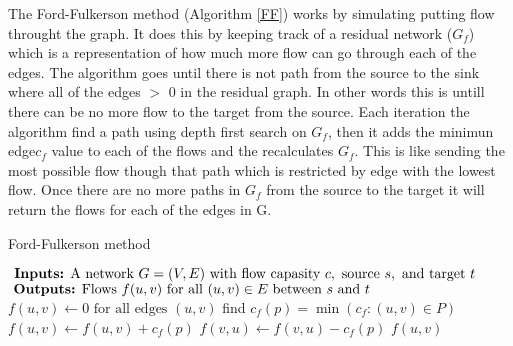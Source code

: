 \documentclass{sig-alternate-05-2015}
\begin{document}
The Ford-Fulkerson method (Algorithm \ref{FF}) works by simulating putting flow throught the graph.  It does this by keeping track of a residual network ($G_{f}$) which is a representation of how much more flow can go through each of the edges.  The algorithm goes until there is not path from the source to the sink where all of the edges $>$ 0 in the residual graph.  In other words this is untill there can be no more flow to the target from the source.  Each iteration the algorithm find a path using depth first search on $G_{f}$, then it adds the minimun edge$ c_{f}$ value to each of the flows and the recalculates $G_{f}$.  This is like sending the most possible flow though that path which is restricted by edge with the lowest flow.  Once there are no more paths in $G_{f}$ from the source to the target it will return the flows for each of the edges in G.


\begin{algorithm}[t]
\caption{Ford-Fulkerson method}
\label{FF}
\begin{algorithmic}
\STATE $\text{ \textbf{Inputs:} A network } G = (V, E) \text{ with flow capasity } c, \text{ source } s, \text{ and target } t$ 
\STATE $ \text{ \textbf{Outputs:} Flows } f(u, v) \text{ for all }(u, v) \in E \text{ between }s \text{ and }t$
\STATE $f(u, v) \leftarrow 0 \text{ for all edges } (u, v)$
\STATE find $c_{f}(p) = \min (c_{f}:(u, v) \in P)$
\STATE  $f(u, v) \leftarrow f(u,v) + c_{f}(p)$
\STATE  $f(v, u) \leftarrow f(v,u) - c_{f}(p)$
\ENDFOR
\ENDWHILE
\RETURN $f(u,v)$
\end{algorithmic}
\end{algorithm}
\end{document}
